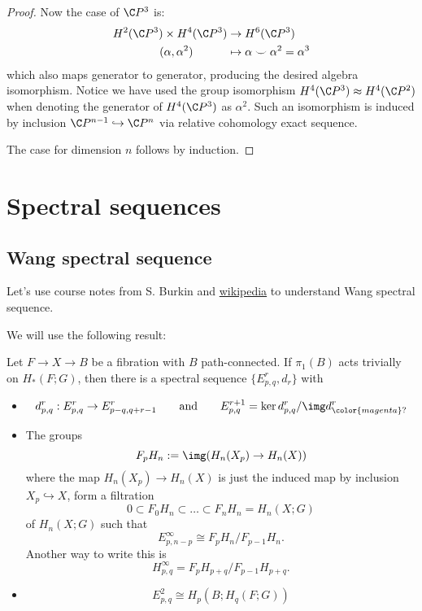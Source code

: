 \begin{proof}
	Now the case of $\C P^3$ is:
	\begin{align*}
		H^2(\C P^3)\times H^4(\C P^3)&\to H^6(\C P^3)\\
		(\alpha,\alpha^2)\qquad\quad&\mapsto\alpha\smile\alpha^2=\alpha^3
	\end{align*}
	which also  maps generator to generator, producing the desired algebra isomorphism. Notice we have used the group isomorphism $H^4(\C P^3)\approx H^4(\C P^2)$ when denoting the generator of $H^4(\C P^3)$ as $\alpha^2$. Such an isomorphism is induced by inclusion $\C P^{n-1}\hookrightarrow\C P^n$ via relative cohomology exact sequence.
	
	The case for dimension $n$ follows by induction.
\end{proof}

\section{Spectral sequences}\label{sec:spectral sequences}
\subsection{Wang spectral sequence}\label{ssec:Wang spectral sequence}

Let's use course notes from S. Burkin and \href{https://en.wikipedia.org/wiki/Spectral_sequence#Wang_sequence}{wikipedia} to understand Wang spectral sequence.

We will use the following result:

\begin{thm}
	Let $F\to X\to B$ be a fibration with $B$ path-connected. If $\pi_1(B)$ acts trivially on $H_*(F;G)$, then there is a spectral sequence $\{E^r_{p,q},d_r\}$ with
	\begin{itemize}
		\item
			\[d^r_{p,q}:E^r_{p,q}\to E^r_{p-q,q+r-1}\qquad \text{and} \qquad E^{r+1}_{p,q}=\ker d^r_{p,q}/\img d^r_{{\color{magenta}?}}\]
		\item The groups
			\[F_pH_n:=\img(H_n(X_p)\to H_n(X))\]
		where the map $H_{n}(X_p)\to H_{n}(X)$ is just the induced map by inclusion $X_p\hookrightarrow X$, form a filtration
		\[0\subset F_0H_n\subset \ldots\subset F_nH_n=H_n(X;G)\]
		of $H_n(X;G)$ such that
		\[E^\infty_{p,n-p}\cong F_pH_n/F_{p-1}H_n.\]
		Another way to write this is
		\[H_{p,q}^\infty=F_pH_{p+q}\Big/F_{p-1}H_{p+q}.\]
	\item \[E^2_{p,q}\cong H_p(B;H_q(F;G))\]
\end{itemize}
\end{thm}


